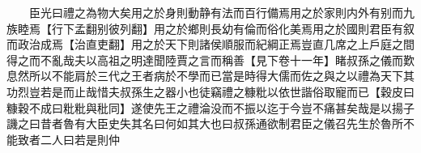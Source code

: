 　　臣光曰禮之為物大矣用之於身則動静有法而百行備焉用之於家則内外有别而九族睦焉【行下孟翻别彼列翻】用之於鄉則長幼有倫而俗化美焉用之於國則君臣有叙而政治成焉【治直吏翻】用之於天下則諸侯順服而紀綱正焉豈直几席之上戶庭之間得之而不亂哉夫以高祖之明達聞陸賈之言而稱善【見下卷十一年】睹叔孫之儀而歎息然所以不能肩於三代之王者病於不學而已當是時得大儒而佐之與之以禮為天下其功烈豈若是而止哉惜夫叔孫生之器小也徒竊禮之糠粃以依世諧俗取寵而已【穀皮曰糠穀不成曰粃粃與秕同】遂使先王之禮淪没而不振以迄于今豈不痛甚矣哉是以揚子譏之曰昔者魯有大臣史失其名曰何如其大也曰叔孫通欲制君臣之儀召先生於魯所不能致者二人曰若是則仲